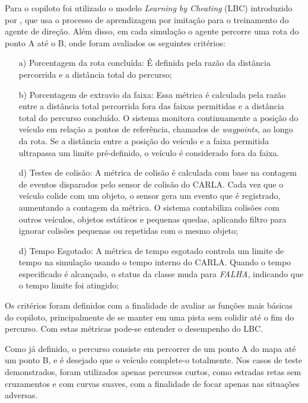 \documentclass[a4paper,12pt,Times]{article}
\begin{document}
Para o copiloto foi utilizado o modelo \textit{Learning by Cheating} (LBC) introduzido por , que usa o processo de aprendizagem por imitação para o treinamento do agente de direção. Além disso, em cada simulação o agente percorre uma rota do ponto A até o B, onde foram avaliados os seguintes critérios:
\begin{enumerate}
    \item[a)] Porcentagem da rota concluída: É definida pela razão da distância percorrida e a distância total do percurso; 
    
    \item[b)] Porcentagem de extravio da faixa: Essa métrica é calculada pela razão entre a distância total percorrida fora das faixas permitidas e a distância total do percurso concluído. O sistema monitora continuamente a posição do veículo em relação a pontos de referência, chamados de \textit{waypoints}, ao longo da rota. Se a distância entre a posição do veículo e a faixa permitida ultrapassa um limite pré-definido, o veículo é considerado fora da faixa. 
    
    \item[d)] Testes de colisão: A métrica de colisão é calculada com base na contagem de eventos disparados pelo sensor de colisão do CARLA. Cada vez que o veículo colide com um objeto, o sensor gera um evento que é registrado, aumentando a contagem da métrica. O sistema contabiliza colisões com outros veículos, objetos estáticos e pequenas quedas, aplicando filtro para ignorar colisões pequenas ou repetidas com o mesmo objeto;
    
    \item[d)] Tempo Esgotado: A métrica de  tempo esgotado controla um limite de tempo na simulação usando o tempo interno do CARLA. Quando o tempo especificado é alcançado, o status da classe muda para \textit{FALHA}, indicando que o tempo limite foi atingido;

\end{enumerate}

Os critérios foram definidos com a finalidade de avaliar as funções mais básicas do copiloto, principalmente de se manter em uma pista sem colidir até o fim do percurso. Com estas métricas pode-se entender o desempenho do LBC.

Como já definido, o percurso consiste em percorrer de um ponto A do mapa até um ponto B, e é desejado que o veículo complete-o totalmente. Nos casos de teste demonstrados, foram utilizados apenas percursos curtos, como estradas retas sem cruzamentos e com curvas suaves, com a finalidade de focar apenas nas situações adversas.
\end{document}
